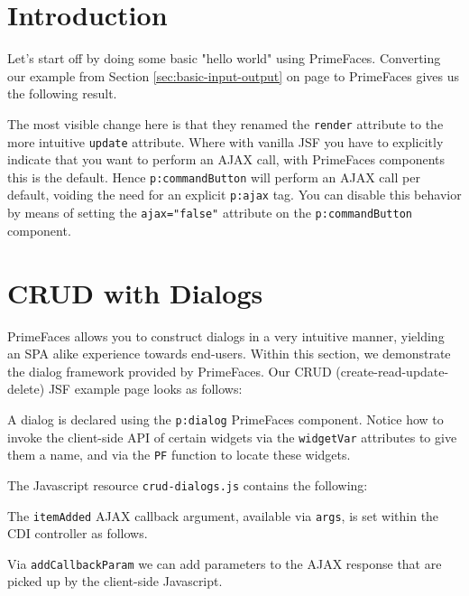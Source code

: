 \section{Introduction}
Let's start off by doing some basic "hello world" using PrimeFaces.
Converting our  example from Section \ref{sec:basic-input-output}  on page \pageref{sec:basic-input-output} to PrimeFaces gives us the following result.

The most visible change here is that they renamed the \texttt{render} attribute to the more intuitive \texttt{update} attribute.
Where with vanilla JSF you have to explicitly indicate that you want to perform an AJAX call, with PrimeFaces components this is the default.
Hence \texttt{p:commandButton} will perform an AJAX call per default, voiding the need for an explicit \texttt{p:ajax} tag.
You can disable this behavior by means of setting the \texttt{ajax="false"} attribute on the \texttt{p:commandButton} component.

\section{CRUD with Dialogs}
PrimeFaces allows you to construct dialogs in a very intuitive manner, yielding an SPA alike experience towards end-users.
Within this section, we demonstrate the dialog framework provided by PrimeFaces.
Our CRUD (create-read-update-delete) JSF example page looks as follows:

A dialog is declared using the \texttt{p:dialog} PrimeFaces component.
Notice how to invoke the client-side API of certain widgets via the \texttt{widgetVar} attributes to give them a name, and via the \texttt{PF} function to locate these widgets.

The Javascript resource \texttt{crud-dialogs.js} contains the following:

The \texttt{itemAdded} AJAX callback argument, available via \texttt{args}, is set within the CDI controller as follows.


Via \texttt{addCallbackParam} we can add parameters to the AJAX response that are picked up by the client-side Javascript.

